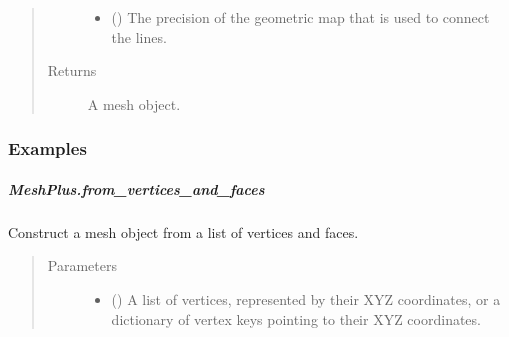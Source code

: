 \documentclass[letterpaper,10pt,english]{sphinxmanual}
\begin{document}
\begin{fulllineitems}
\begin{fulllineitems}
\begin{quote}
\begin{description}
\begin{itemize}
\item {} 
 () \textendash{} The precision of the geometric map that is used to connect the lines.

\end{itemize}

\item[{Returns}] \leavevmode
{} \textendash{} A mesh object.

\end{description}\end{quote}
\subsubsection*{Examples}

\begin{sphinxVerbatim}[commandchars=\\\{\}]
\end{sphinxVerbatim}

\end{fulllineitems}



\subparagraph{MeshPlus.from\_vertices\_and\_faces}
\label{\detokenize{api/generated/directional_clustering.mesh.MeshPlus.from_vertices_and_faces:meshplus-from-vertices-and-faces}}\label{\detokenize{api/generated/directional_clustering.mesh.MeshPlus.from_vertices_and_faces::doc}}

\begin{fulllineitems}
\label{\detokenize{api/generated/directional_clustering.mesh.MeshPlus.from_vertices_and_faces:directional_clustering.mesh.MeshPlus.from_vertices_and_faces}}
Construct a mesh object from a list of vertices and faces.
\begin{quote}\begin{description}
\item[{Parameters}] \leavevmode\begin{itemize}
\item {} 
 () \textendash{} A list of vertices, represented by their XYZ coordinates,
or a dictionary of vertex keys pointing to their XYZ coordinates.


\end{itemize}
\end{description}
\end{quote}
\end{fulllineitems}
\end{fulllineitems}
\end{document}
